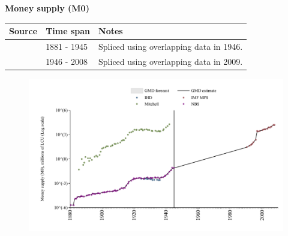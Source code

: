 \documentclass[12pt,a4paper,landscape]{article}
\begin{document}
\begin{adjustbox}{max totalsize={\paperwidth}{\paperheight},center}
\begin{minipage}[t][\textheight][t]{\textwidth}
\vspace*{0.5cm}
{}
\begin{center}
{\Large\bfseries Money supply (M0)}
\end{center}
\vspace{0.5cm}
\begin{table}[H]
\centering
\small
\begin{tabular}{|l|l|l|}
\hline
\textbf{Source} & \textbf{Time span} & \textbf{Notes} \\
\hline
\rowcolor{white}\cite{NBS}& 1881 - 1945 &Spliced using overlapping data in 1946. \\
\rowcolor{lightgray}\cite{IMF_MFS}& 1946 - 2008 &Spliced using overlapping data in 2009. \\
\hline
\end{tabular}
\end{table}
\begin{figure}[H]
\centering
\includegraphics[width=\textwidth,height=0.6\textheight,keepaspectratio]{graphs/BGR_M0.pdf}
\end{figure}
\end{minipage}
\end{adjustbox}
\end{document}
